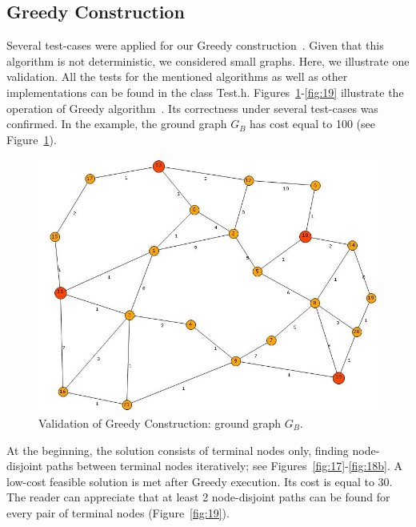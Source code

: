 \subsection{Greedy Construction}
Several test-cases were applied for our Greedy construction~\cite{8,11}. Given that this algorithm is not 
deterministic, we considered small graphs. Here, we illustrate one validation. All the tests for the mentioned algorithms as well as other implementations can be found in the class Test.h. 
Figures~\ref{fig:16}-\ref{fig:19} illustrate the operation of Greedy algorithm~\cite{8,11}. 
Its correctness under several test-cases was confirmed. In the example, the ground graph $G_B$ has cost equal to 
100 (see Figure~\ref{fig:16}). 

\begin{figure}[H]
\begin{center}
\includegraphics[scale=0.6]{16.jpg}
\caption{Validation of Greedy Construction: ground graph $G_B$.}\label{fig:16}
\end{center} 
\end{figure}

At the beginning, the solution consists of terminal nodes only, finding node-disjoint paths between terminal nodes iteratively; see Figures~\ref{fig:17}-\ref{fig:18b}. A low-cost feasible solution is met after Greedy execution. Its cost is equal to 30. The reader can appreciate that at least 2 node-disjoint paths can be found for every pair of terminal nodes (Figure~\ref{fig:19}). 

